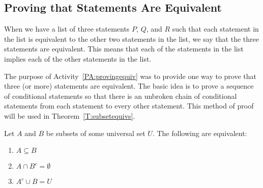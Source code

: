 \subsection*{Proving that Statements Are Equivalent}
When we have a list of three statements $P$, $Q$,  and  $R$  such that  each statement in the list is equivalent to the other two statements in the list, we say that the three statements are equivalent.  This means that each of the statements in the list implies each of the other statements in the list.  

The purpose of \typeu Activity~\ref*{PA:provingequiv} was to provide one way to prove that three (or more) statements are equivalent.  The basic idea is to prove a sequence of conditional statements so that there is an unbroken chain of conditional statements from each statement to every other statement.  This method of proof will be used in Theorem~\ref{T:subsetequivs}.
%
\begin{theorem} \label{T:subsetequivs}
Let  $A$  and  $B$  be subsets of some universal set  $U$.  The following are equivalent:
\begin{multicols}{3}
\begin{enumerate}
  \item $A \subseteq B$ \label{T:subsetitem1}
  \item $A \cap B^c  = \emptyset $  \label{T:subsetitem2}
  \item $A^c  \cup B = U$  \label{T:subsetitem3}
\end{enumerate}
\end{multicols}
\end{theorem}
%
